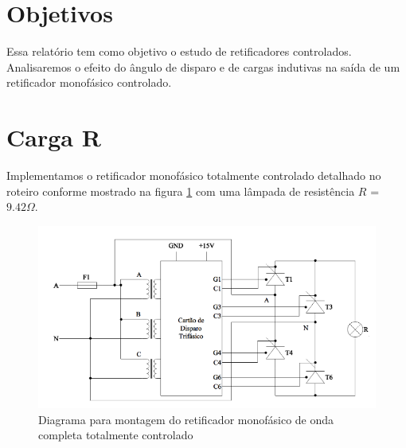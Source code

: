 \documentclass{article}
\begin{document}


\onehalfspacing
\section{Objetivos}
	Essa relatório tem como objetivo o estudo de retificadores controlados. Analisaremos o efeito do ângulo de disparo e de cargas indutivas na saída de um retificador monofásico controlado.
	 
\section{Carga R}
Implementamos o retificador monofásico totalmente controlado detalhado no roteiro conforme mostrado na figura \ref{fig:resq} com uma lâmpada de resistência $R$ = $9.42 \Omega$.
\begin{figure}[H]
	\centering
	\includegraphics[width=\linewidth]{dados/resq}
	\caption{Diagrama para montagem do retificador monofásico de onda completa totalmente controlado}
	\label{fig:resq}
\end{figure}
\end{document}
